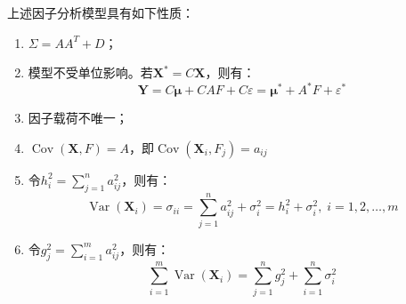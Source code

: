 \begin{property}\label{prop:FactorAnalysis}
	上述因子分析模型具有如下性质：
	\begin{enumerate}
		\item $\Sigma=AA^T+D$；
		\item 模型不受单位影响。若$\mathbf{X}^*=C\mathbf{X}$，则有：
		\begin{equation*}
			\mathbf{Y}=C\boldsymbol{\mu}+CAF+C\varepsilon=\boldsymbol{\mu}^*+A^*F+\varepsilon^*
		\end{equation*}
		\item 因子载荷不唯一；
		\item $\operatorname{Cov}(\mathbf{X},F)=A$，即$\operatorname{Cov}(\mathbf{X}_i,F_j)=a_{ij}$
		\item 令$h_i^2=\sum\limits_{j=1}^{n}a_{ij}^2$，则有：
		\begin{equation*}
			\operatorname{Var}(\mathbf{X}_i)=\sigma_{ii}=\sum_{j=1}^{n}a_{ij}^2+\sigma_i^2=h_i^2+\sigma_i^2,\;i=1,2,\dots,m
		\end{equation*}
		\item 令$g_j^2=\sum\limits_{i=1}^{m}a_{ij}^2$，则有：
		\begin{equation*}
			\sum_{i=1}^{m}\operatorname{Var}(\mathbf{X}_i)=\sum_{j=1}^{n}g_j^2+\sum_{i=1}^{n}\sigma_i^2
		\end{equation*}
	\end{enumerate}
\end{property}
